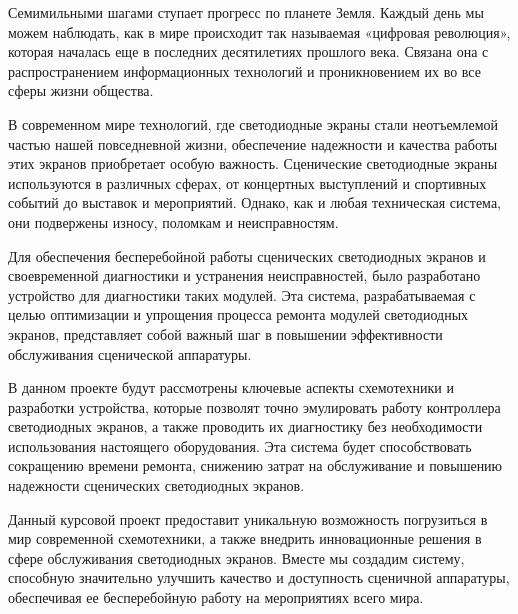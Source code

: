 \label{sec:intro}

Семимильными шагами ступает прогресс по планете Земля. Каждый день мы можем наблюдать,
как в мире происходит так называемая «цифровая революция», которая
началась еще в последних десятилетиях прошлого века. Связана она с распространением
информационных технологий и проникновением их во все сферы жизни общества.


В современном мире технологий, где светодиодные экраны стали неотъемлемой частью нашей повседневной жизни, обеспечение надежности и качества работы этих экранов приобретает особую важность. Сценические светодиодные экраны используются в различных сферах, от концертных выступлений и спортивных событий до выставок и мероприятий. Однако, как и любая техническая система, они подвержены износу, поломкам и неисправностям.

Для обеспечения бесперебойной работы сценических светодиодных экранов и своевременной диагностики и устранения неисправностей, было разработано устройство для диагностики таких модулей. Эта система, разрабатываемая с целью оптимизации и упрощения процесса ремонта модулей светодиодных экранов, представляет собой важный шаг в повышении эффективности обслуживания сценической аппаратуры.

В данном проекте будут рассмотрены ключевые аспекты схемотехники и разработки устройства, которые позволят точно эмулировать работу контроллера светодиодных экранов, а также проводить их диагностику без необходимости использования настоящего оборудования. Эта система будет способствовать сокращению времени ремонта, снижению затрат на обслуживание и повышению надежности сценических светодиодных экранов.

Данный курсовой проект предоставит уникальную возможность погрузиться в мир современной схемотехники, а также внедрить инновационные решения в сфере обслуживания светодиодных экранов. Вместе мы создадим систему, способную значительно улучшить качество и доступность сценичной аппаратуры, обеспечивая ее бесперебойную работу на мероприятиях всего мира.